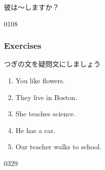 \documentclass[aspectratio=169,xcolor={dvipsnames,table}]{beamer}
\newcommand{\myaudio}[1]{\href{#1}{\faVolumeUp}}
\begin{document}
\begin{frame}[plain]{彼は〜しますか？}
\vspace*{-8pt}

\hfill{\tiny 0108}\,{\scriptsize \myaudio{./audio/010_question_do_05.mp3}}
\end{frame}
\begin{frame}[plain]\frametitle{Exercises}

つぎの文を疑問文にしましょう

 \begin{enumerate}
  \item<1-> You like flowers.\hspace{59.7pt}
  \item<1-> They live in Boston.\hspace{47.5pt}%
  \item<1-> She teaches science.\hspace{42pt}%
  \item<1-> He has  a car.\hspace{80.5pt}%
  \item<1-> Our teacher walks to school.
 \end{enumerate}

\hfill{\tiny 0329}\,{\scriptsize \myaudio{./audio/010_question_do_06.mp3}}

\end{frame}
\end{document}

